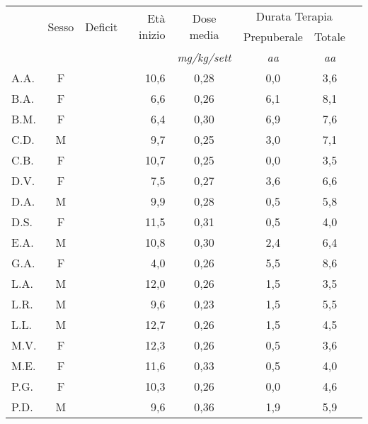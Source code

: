 \begin{table}[!h]
\begin{center}
\begin{tabular}{lccrcccl}
\toprule
 &    \multirow{2}{*}{Sesso} &
 \multirow{2}{*}{Deficit}    & \multirow{2}{*}{Età inizio} & \multirow{2}{*}{Dose media} & \multicolumn{2}{c}{Durata Terapia}\\
\cmidrule(r){6-7}
 &       &   &    &  	& Prepuberale & Totale \\
 &     &	&			& \emph{mg/kg/sett}	& \emph{aa} & \emph{aa} \\
\midrule                                  	
A.A.	& F &  		 & 10,6  	&  0,28     	& 0,0                 & 3,6  \\
B.A.	& F & \checkmark & 6,6   	&  0,26     	& 6,1                 & 8,1  \\
B.M.	& F & \checkmark & 6,4   	&  0,30     	& 6,9                 & 7,6  \\
C.D.	& M &  	  	 & 9,7   	&  0,25     	& 3,0                 & 7,1  \\
C.B.	& F &  		 & 10,7  	&  0,25     	& 0,0                 & 3,5  \\
D.V.	& F & \checkmark & 7,5   	&  0,27     	& 3,6                 & 6,6  \\
D.A.	& M &  		 & 9,9   	&  0,28     	& 0,5                 & 5,8  \\
D.S.	& F & \checkmark & 11,5  	&  0,31     	& 0,5                 & 4,0  \\
E.A.	& M &  		 & 10,8  	&  0,30     	& 2,4                 & 6,4  \\
G.A.	& F &  		 & 4,0   	&  0,26     	& 5,5                 & 8,6  \\
L.A.	& M & \checkmark & 12,0  	&  0,26     	& 1,5                 & 3,5  \\
L.R.	& M &  		 & 9,6   	&  0,23     	& 1,5                 & 5,5  \\
L.L.	& M &  		 & 12,7  	&  0,26     	& 1,5                 & 4,5  \\
M.V.	& F & \checkmark & 12,3  	&  0,26     	& 0,5                 & 3,6  \\
M.E.	& F &  		 & 11,6  	&  0,33     	& 0,5                 & 4,0  \\
P.G.	& F & \checkmark & 10,3  	&  0,26     	& 0,0                 & 4,6  \\
P.D.	& M &  		 & 9,6   	&  0,36     	& 1,9                 & 5,9  \\

\end{tabular}
\end{center}
\end{table}
